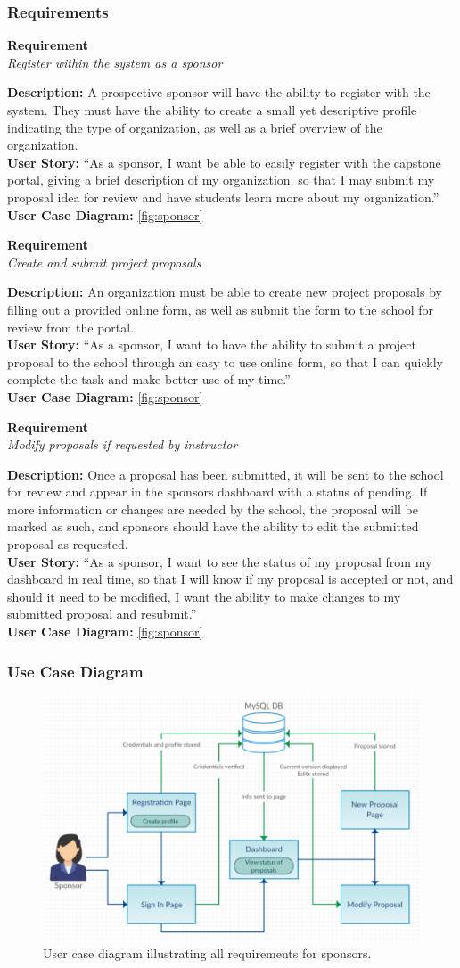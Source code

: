 \documentclass[12pt]{article}
\newcommand{\requirement}[4] {
		\noindent
		\begin{center}\textbf{Requirement\\}\textit{#1}\\\end{center}
		\textbf{Description:} #2\\
		\textbf{User Story:} ``#3''\\
		\textbf{User Case Diagram:} #4\\
}
\begin{document}
\subsubsection{Requirements}
\requirement{Register within the system as a sponsor}
			{A prospective sponsor will have the ability to register with the system. They must have the ability to create a small yet descriptive profile indicating the type of organization, as well as a brief overview of the organization.}
			{As a sponsor, I want be able to easily register with the capstone portal, giving a brief description of my organization, so that I may submit my proposal idea for review and have students learn more about my organization.}
			{\autoref{fig:sponsor}}

\requirement{Create and submit project proposals}
			{An organization must be able to create new project proposals by filling out a provided online form, as well as submit the form to the school for review from the portal.}
			{As a sponsor, I want to have the ability to submit a project proposal to the school through an easy to use online form, so that I can quickly complete the task and make better use of my time.}
			{\autoref{fig:sponsor}}

\requirement{Modify proposals if requested by instructor}
			{Once a proposal has been submitted, it will be sent to the school for review and appear in the sponsors dashboard with a status of pending. If more information or changes are needed by the school, the proposal will be marked as such, and sponsors should have the ability to edit the submitted proposal as requested.}
			{As a sponsor, I want to see the status of my proposal from my dashboard in real time, so that I will know if my proposal is accepted or not, and should it need to be modified, I want the ability to make changes to my submitted proposal and resubmit.}
			{\autoref{fig:sponsor}}

\subsubsection{Use Case Diagram}
\begin{figure}[!htb]
	\includegraphics[width=\linewidth]{sponsor.png}
	\caption{User case diagram illustrating all requirements for sponsors.}
	\label{fig:sponsor}
\end{figure}
\end{document}

